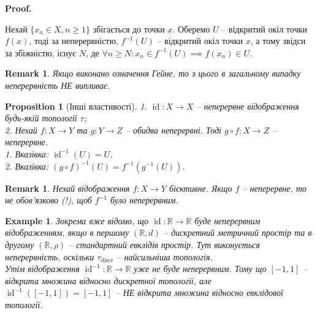 \documentclass[a4paper, 10pt]{article}
\makeatletter
\theoremstyle{theoremdd}
\newtheorem{example}[theorem]{Example}
\newtheorem{proposition}[theorem]{Proposition}
\newtheorem{remark}[theorem]{Remark}
\DeclareMathOperator{\id}{id}
\renewenvironment{proof}[1][Proof.\\]{\par
\pushQED{\hfill \qed}%
\normalfont \topsep6\p@\@plus6\p@\relax
\trivlist
\item\relax
{\bfseries
#1\@addpunct{.}}\hspace\labelsep\ignorespaces
}{%
\popQED\endtrivlist\@endpefalse
}
\makeatother
\begin{document}
\begin{proof}
Нехай $\{x_n \in X, n \geq 1\}$ збігається до точки $x$. Оберемо $U$ -- відкритий окіл точки $f(x)$, тоді за неперервністю, $f^{-1}(U)$ -- відкритий окіл точки $x$, а тому звідси за збіжністю, існує $N$, де $\forall n \geq N: x_n \in f^{-1}(U) \implies f(x_n) \in U$.
\end{proof}

\begin{remark}
Якщо виконано означення Гейне, то з цього в загальному випадку неперервність НЕ випливає.
\end{remark}

\begin{proposition}[Інші властивості]
1. $\id \colon X \to X$ -- неперервне відображення будь-якій топології $\tau$;\\
2. Нехай $f \colon X \to Y$ та $g \colon Y \to Z$ -- обидва неперервні. Тоді $g \circ f \colon X \to Z$ -- неперервне.
\bigskip \\
1. \textit{Вказівка: $\id^{-1}(U) = U$.}\\
2. \textit{Вказівка: $(g \circ f)^{-1}(U) = f^{-1}(g^{-1}(U))$.}
\end{proposition}

\begin{remark}
Нехай відображення $f \colon X \to Y$ бієктивне. Якщо $f$ -- неперервне, то не обов'язково (!), щоб $f^{-1}$ було неперервним.
\end{remark}

\begin{example}
Зокрема вже відомо, що $\id \colon \mathbb{R} \to \mathbb{R}$ буде неперервним відображенням, якщо в першому $(\mathbb{R},d)$ -- дискретний метричний простір та в другому $(\mathbb{R},\rho)$ -- стандартний евклідів простір. Тут виконується неперервність, оскільки $\tau_{\text{discr}}$ -- найсильніша топологія.\\
Утім відображення $\id^{-1} \colon \mathbb{R} \to \mathbb{R}$ уже не буде неперервним. Тому що $[-1,1]$ -- відкрита множина відносно дискретної топології, але $\id^{-1}([-1,1]) = [-1,1]$ -- НЕ відкрита множина відносно евклідової топології.
\end{example}
\end{document}
